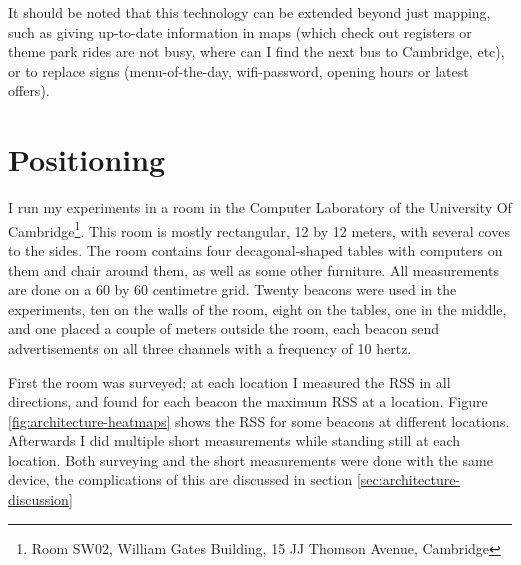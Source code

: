It should be noted that this technology can be extended beyond just mapping, such as giving up-to-date information in maps (which check out registers or theme park rides are not busy, where can I find the next bus to Cambridge, etc), or to replace signs (menu-of-the-day, wifi-password, opening hours or latest offers). 

\section{Positioning}


I run my experiments in a room in the Computer Laboratory of the University Of Cambridge\footnote{Room SW02, William Gates Building, 15 JJ Thomson Avenue, Cambridge}.
This room is mostly rectangular, 12 by 12 meters, with several coves to the sides.
The room contains four decagonal-shaped tables with computers on them and chair around them, as well as some other furniture.
All measurements are done on a 60 by 60 centimetre grid.
Twenty beacons were used in the experiments, ten on the walls of the room, eight on the tables, one in the middle, and one placed a couple of meters outside the room, each beacon send advertisements on all three channels with a frequency of 10 hertz.

First the room was surveyed; at each location I measured the RSS in all directions, and found for each beacon the maximum RSS at a location.
Figure \ref{fig:architecture-heatmaps} shows the RSS for some beacons at different locations.
Afterwards I did multiple short measurements while standing still at each location.
Both surveying and the short measurements were done with the same device, the complications of this are discussed in section \ref{sec:architecture-discussion}


